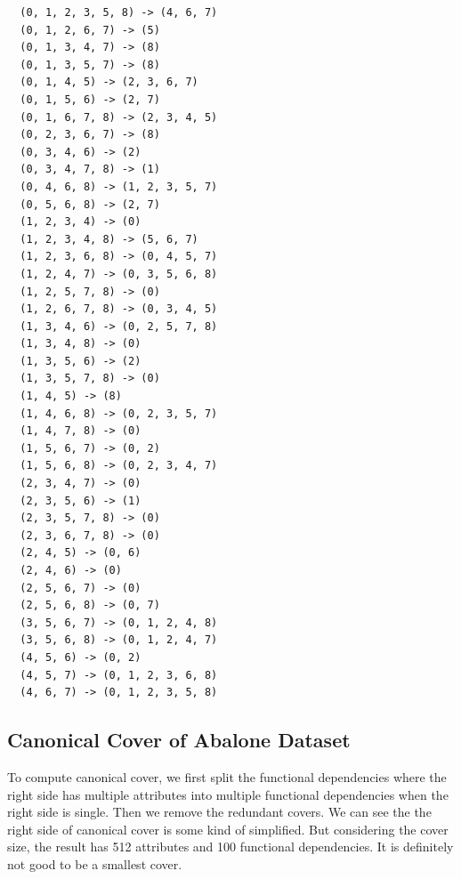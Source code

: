 \documentclass[11pt]{book}
\begin{document}
\begin{verbatim}
  (0, 1, 2, 3, 5, 8) -> (4, 6, 7)
  (0, 1, 2, 6, 7) -> (5)
  (0, 1, 3, 4, 7) -> (8)
  (0, 1, 3, 5, 7) -> (8)
  (0, 1, 4, 5) -> (2, 3, 6, 7)
  (0, 1, 5, 6) -> (2, 7)
  (0, 1, 6, 7, 8) -> (2, 3, 4, 5)
  (0, 2, 3, 6, 7) -> (8)
  (0, 3, 4, 6) -> (2)
  (0, 3, 4, 7, 8) -> (1)
  (0, 4, 6, 8) -> (1, 2, 3, 5, 7)
  (0, 5, 6, 8) -> (2, 7)
  (1, 2, 3, 4) -> (0)
  (1, 2, 3, 4, 8) -> (5, 6, 7)
  (1, 2, 3, 6, 8) -> (0, 4, 5, 7)
  (1, 2, 4, 7) -> (0, 3, 5, 6, 8)
  (1, 2, 5, 7, 8) -> (0)
  (1, 2, 6, 7, 8) -> (0, 3, 4, 5)
  (1, 3, 4, 6) -> (0, 2, 5, 7, 8)
  (1, 3, 4, 8) -> (0)
  (1, 3, 5, 6) -> (2)
  (1, 3, 5, 7, 8) -> (0)
  (1, 4, 5) -> (8)
  (1, 4, 6, 8) -> (0, 2, 3, 5, 7)
  (1, 4, 7, 8) -> (0)
  (1, 5, 6, 7) -> (0, 2)
  (1, 5, 6, 8) -> (0, 2, 3, 4, 7)
  (2, 3, 4, 7) -> (0)
  (2, 3, 5, 6) -> (1)
  (2, 3, 5, 7, 8) -> (0)
  (2, 3, 6, 7, 8) -> (0)
  (2, 4, 5) -> (0, 6)
  (2, 4, 6) -> (0)
  (2, 5, 6, 7) -> (0)
  (2, 5, 6, 8) -> (0, 7)
  (3, 5, 6, 7) -> (0, 1, 2, 4, 8)
  (3, 5, 6, 8) -> (0, 1, 2, 4, 7)
  (4, 5, 6) -> (0, 2)
  (4, 5, 7) -> (0, 1, 2, 3, 6, 8)
  (4, 6, 7) -> (0, 1, 2, 3, 5, 8)
\end{verbatim}

\subsection{Canonical Cover of Abalone Dataset}

To compute canonical cover, we first split the functional dependencies where the right side has multiple attributes into multiple functional dependencies when the right side is single.
Then we remove the redundant covers. We can see the the right side of canonical cover is some kind of simplified. But considering the cover size, the result has 512 attributes and 100 functional dependencies. It is definitely not good to be a smallest cover.
\end{document}
